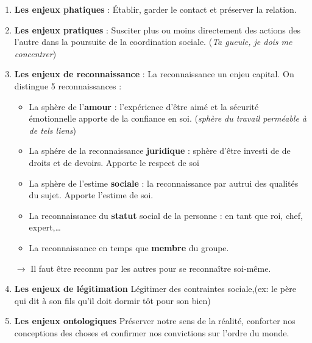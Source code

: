 \documentclass[11pt]{article} %
\begin{document}
\begin{enumerate}
        
    \item \textbf{Les enjeux phatiques} : Établir, garder le contact et
          préserver la relation.

    \item \textbf{Les enjeux pratiques} : Susciter plus ou moins
    directement des actions des l'autre dans la poursuite de la
    coordination sociale. (\textit{Ta gueule, je dois me concentrer})

    \item \textbf{Les enjeux de reconnaissance} : La reconnaissance
    un enjeu capital. On distingue 5 reconnaissances :
    \begin{itemize}
        \item La sphère de l'\textbf{amour} : l'expérience d'être aimé et
        la sécurité émotionnelle apporte de la confiance en soi.
        (\textit{sphère du travail perméable à de tels liens})

        \item La sphére de la reconnaissance \textbf{juridique} : sphère
        d'être investi de de droits et de devoirs. Apporte le respect de
        soi

        \item La sphère de l'estime \textbf{sociale} : la
        reconnaissance par autrui des qualités du sujet. Apporte
        l'estime de soi.

        \item La reconnaissance du \textbf{statut} social de la personne : en tant
        que roi, chef, expert,\ldots

        \item La reconnaissance en temps que \textbf{membre} du groupe.

    \end{itemize} 
    
    $\to$ Il faut être reconnu par les autres pour se reconnaître soi-même.

    \item \textbf{Les enjeux de légitimation} Légitimer des
    contraintes sociale,(ex: le père qui dit à son fils qu'il doit
    dormir tôt pour son bien)

     \item \textbf{Les enjeux ontologiques} Préserver notre sens de la
    réalité, conforter nos conceptions des choses et confirmer nos
    convictions sur l'ordre du monde.

\end{enumerate}
\end{document}

